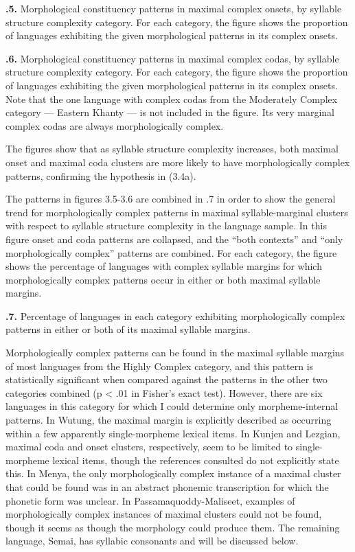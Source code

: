 \textbf{.5.} Morphological constituency patterns in maximal complex onsets, by syllable structure complexity category. For each category, the figure shows the proportion of languages exhibiting the given morphological patterns in its complex onsets.

\textbf{.6.} Morphological constituency patterns in maximal complex codas, by syllable structure complexity category. For each category, the figure shows the proportion of languages exhibiting the given morphological patterns in its complex onsets. Note that the one language with complex codas from the Moderately Complex category — Eastern Khanty — is not included in the figure. Its very marginal complex codas are always morphologically complex.

  The figures show that as syllable structure complexity increases, both maximal onset and maximal coda clusters are more likely to have morphologically complex patterns, confirming the hypothesis in (3.4a).

  The patterns in figures 3.5-3.6 are combined in .7 in order to show the general trend for morphologically complex patterns in maximal syllable-marginal clusters with respect to syllable structure complexity in the language sample. In this figure onset and coda patterns are collapsed, and the “both contexts” and “only morphologically complex” patterns are combined. For each category, the figure shows the percentage of languages with complex syllable margins for which morphologically complex patterns occur in either or both maximal syllable margins.

\textbf{.7.} Percentage of languages in each category exhibiting morphologically complex patterns in either or both of its maximal syllable margins.

  Morphologically complex patterns can be found in the maximal syllable margins of most languages from the Highly Complex category, and this pattern is statistically significant when compared against the patterns in the other two categories combined (p < .01 in Fisher’s exact test). However, there are six languages in this category for which I could determine only morpheme-internal patterns. In Wutung, the maximal margin is explicitly described as occurring within a few apparently single-morpheme lexical items. In Kunjen and Lezgian, maximal coda and onset clusters, respectively, seem to be limited to single-morpheme lexical items, though the references consulted do not explicitly state this. In Menya, the only morphologically complex instance of a maximal cluster that could be found was in an abstract phonemic transcription for which the phonetic form was unclear. In Passamaquoddy-Maliseet, examples of morphologically complex instances of maximal clusters could not be found, though it seems as though the morphology could produce them. The remaining language, Semai, has syllabic consonants and will be discussed below.

